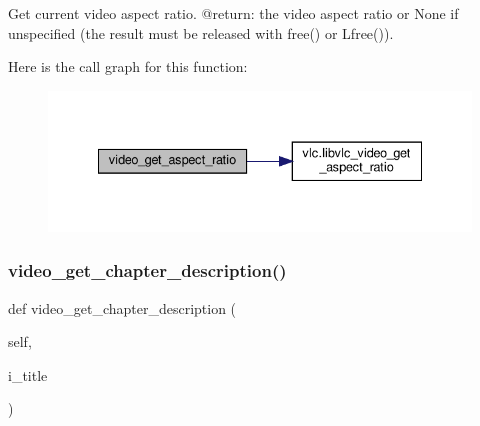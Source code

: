 \begin{DoxyVerb}Get current video aspect ratio.
@return: the video aspect ratio or None if unspecified (the result must be released with free() or L{free}()).
\end{DoxyVerb}
 Here is the call graph for this function\+:
\nopagebreak
\begin{figure}[H]
\begin{center}
\leavevmode
\includegraphics[width=335pt]{classvlc_1_1_media_player_af56a4698e1e25d37afd746f59fde9b2d_cgraph}
\end{center}
\end{figure}
\mbox{\label{classvlc_1_1_media_player_aa0d4ef63e93059de3f836a54dc2fda67}} 
\subsubsection{\texorpdfstring{video\+\_\+get\+\_\+chapter\+\_\+description()}{video\_get\_chapter\_description()}}
{\footnotesize\ttfamily def video\+\_\+get\+\_\+chapter\+\_\+description (\begin{DoxyParamCaption}\item[{}]{self,  }\item[{}]{i\+\_\+title }\end{DoxyParamCaption})}

